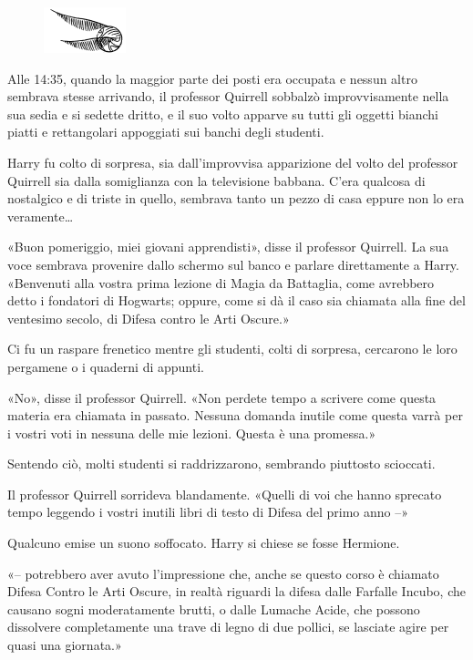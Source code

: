 \begin{figure}[h!]
        \includegraphics[scale=0.4]{boccino.png}
        \centering
\end{figure}

Alle 14:35, quando la maggior parte dei posti era occupata e nessun altro sembrava stesse arrivando, il professor Quirrell sobbalzò improvvisamente nella sua sedia e si sedette dritto, e il suo volto apparve su tutti gli oggetti bianchi piatti e rettangolari appoggiati sui banchi degli studenti.

Harry fu colto di sorpresa, sia dall’improvvisa apparizione del volto del professor Quirrell sia dalla somiglianza con la televisione babbana. C’era qualcosa di nostalgico e di triste in quello, sembrava tanto un pezzo di casa eppure non lo era veramente…

«Buon pomeriggio, miei giovani apprendisti», disse il professor Quirrell. La sua voce sembrava provenire dallo schermo sul banco e parlare direttamente a Harry. «Benvenuti alla vostra prima lezione di Magia da Battaglia, come avrebbero detto i fondatori di Hogwarts; oppure, come si dà il caso sia chiamata alla fine del ventesimo secolo, di Difesa contro le Arti Oscure.»

Ci fu un raspare frenetico mentre gli studenti, colti di sorpresa, cercarono le loro pergamene o i quaderni di appunti.

«No», disse il professor Quirrell. «Non perdete tempo a scrivere come questa materia era chiamata in passato. Nessuna domanda inutile come questa varrà per i vostri voti in nessuna delle mie lezioni. Questa è una promessa.»

Sentendo ciò, molti studenti si raddrizzarono, sembrando piuttosto scioccati.

Il professor Quirrell sorrideva blandamente. «Quelli di voi che hanno sprecato tempo leggendo i vostri inutili libri di testo di Difesa del primo anno –»

Qualcuno emise un suono soffocato. Harry si chiese se fosse Hermione.

«– potrebbero aver avuto l’impressione che, anche se questo corso è chiamato Difesa Contro le Arti Oscure, in realtà riguardi la difesa dalle Farfalle Incubo, che causano sogni moderatamente brutti, o dalle Lumache Acide, che possono dissolvere completamente una trave di legno di due pollici, se lasciate agire per quasi una giornata.»

